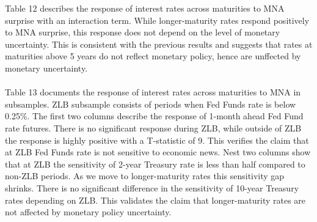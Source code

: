 \documentclass[12pt]{article}
\begin{document}
Table 12 describes the response of interest rates across maturities to MNA surprise with an interaction term. While longer-maturity rates respond positively to MNA surprise, this response does not depend on the level of monetary uncertainty. This is consistent with the previous results and suggests that rates at maturities above 5 years do not reflect monetary policy, hence are unffected by monetary uncertainty.
\paragraph{}
Table 13 documents the response of interest rates across maturities to MNA in subsamples. ZLB subsample consists of periods when Fed Funds rate is below 0.25\%. The first two columns describe the response of 1-month ahead Fed Fund rate futures. There is no significant response during ZLB, while outside of ZLB the response is highly positive with a T-statistic of 9. This verifies the claim that at ZLB Fed Funds rate is not sensitive to economic news. Nest two columns show that at ZLB the sensitivity of 2-year Treasury rate is less than half compared to non-ZLB periods. As we move to longer-maturity rates this sensitivity gap shrinks. There is no significant difference in the sensitivity of 10-year Treasury rates depending on ZLB. This validates the claim that longer-maturity rates are not affected by monetary policy uncertainty.
\end{document}
